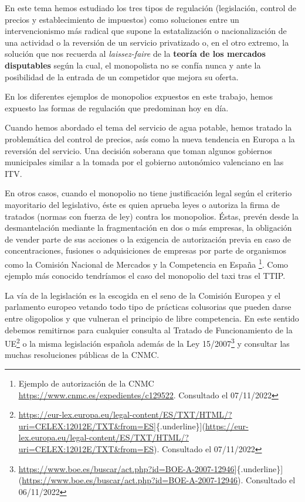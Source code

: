 \documentclass[
]{article}
\begin{document}
En este tema hemos estudiado los tres tipos de regulación (legislación,
control de precios y establecimiento de impuestos) como soluciones entre
un intervencionismo más radical que supone la estatalización o
nacionalización de una actividad o la reversión de un servicio
privatizado o, en el otro extremo, la solución que nos recuerda al
\emph{laissez-faire} de la \textbf{teoría de los mercados disputables}
según la cual, el monopolista no se confía nunca y ante la posibilidad
de la entrada de un competidor que mejora su oferta.

En los diferentes ejemplos de monopolios expuestos en este trabajo,
hemos expuesto las formas de regulación que predominan hoy en día.

Cuando hemos abordado el tema del servicio de agua potable, hemos
tratado la problemática del control de precios, asís como la nueva
tendencia en Europa a la reversión del servicio. Una decisión soberana
que toman algunos gobiernos municipales similar a la tomada por el
gobierno autonómico valenciano en las ITV.

En otros casos, cuando el monopolio no tiene justificación legal según
el criterio mayoritario del legislativo, éste es quien aprueba leyes o
autoriza la firma de tratados (normas con fuerza de ley) contra los
monopolios. Éstas, prevén desde la desmantelación mediante la
fragmentación en dos o más empresas, la obligación de vender parte de
sus acciones o la exigencia de autorización previa en caso de
concentraciones, fusiones o adquisiciones de empresas por parte de
organismos como la Comisión Nacional de Mercados y la Competencia en
España \footnote{Ejemplo de autorización de la CNMC
  \href{https://www.cnmc.es/expedientes/c129522}{\ul{https://www.cnmc.es/expedientes/c129522}}.
  Consultado el 07/11/2022}. Como ejemplo más conocido tendríamos el
caso del monopolio del taxi tras el TTIP.

La vía de la legislación es la escogida en el seno de la Comisión
Europea y el parlamento europeo vetando todo tipo de prácticas
colusorias que pueden darse entre oligopolios y que vulneran el
principio de libre competencia. En este sentido debemos remitirnos para
cualquier consulta al Tratado de Funcionamiento de la UE\footnote{\url{https://eur-lex.europa.eu/legal-content/ES/TXT/HTML/?uri=CELEX:12012E/TXT\&from=ES}{]}\{.underline\}{]}(\url{https://eur-lex.europa.eu/legal-content/ES/TXT/HTML/?uri=CELEX:12012E/TXT\&from=ES}).
  Consultado el 07/11/2022} o la misma legislación española además de la
Ley 15/2007\footnote{\url{https://www.boe.es/buscar/act.php?id=BOE-A-2007-12946}{]}\{.underline\}{]}(\url{https://www.boe.es/buscar/act.php?id=BOE-A-2007-12946}).
  Consultado el 06/11/2022} y consultar las muchas resoluciones públicas
de la CNMC.
\end{document}
